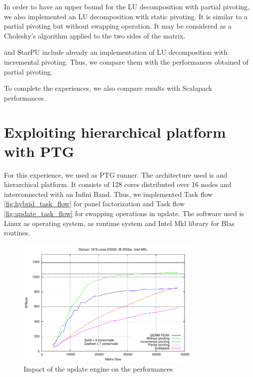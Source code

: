 In order to have an upper bound for the LU decomposition with partial pivoting, we also implemented an LU decomposition with static pivoting. It is similar to a partial pivoting but without swapping operation. It may be considered as a Cholesky's algorithm applied to the two sides of the matrix.

\dague and StarPU include already an implementation of LU decomposition with incremental pivoting. Thus, we compare them with the performances obtained of partial pivoting.

To complete the experiences, we also compare results with Scalapack performances.

\section{Exploiting hierarchical platform with PTG}
For this experience, we used \dague as PTG runner. The architecture used is and hierarchical platform. It consists of 128 cores distributed over 16 nodes and interconnected with an Infini Band. Thus, we implemented Task flow \ref{fig:hybrid_task_flow} for panel factorization and Task flow \ref{fig:update_task_flow} for swapping operations in update. The software used is Linux as operating system, \dague as runtime system and Intel Mkl library for Blas routines.

\begin{figure}
\centering
\includegraphics[width=0.8\textwidth]{figures/partial_pivoting_problem.pdf}
\caption{Impact of the update engine on the performances\label{fig:pp}} 
\end{figure}


